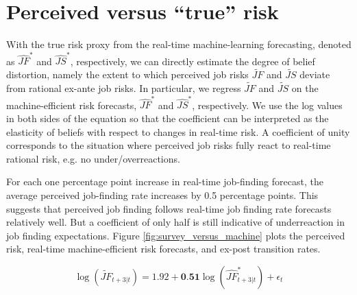 
\section{Perceived versus ``true'' risk}

With the true risk proxy from the real-time machine-learning forecasting, denoted as $\widehat{JF}^*$ and $\widehat{JS}^*$, respectively, we can directly estimate the degree of belief distortion, namely the extent to which perceived job risks $\widetilde{JF}$ and $\widetilde{JS}$ deviate from rational ex-ante job risks. In particular, we regress $\widetilde{JF}$ and $\widetilde{JS}$ on the machine-efficient risk forecasts, $\widehat{JF}^*$ and $\widehat{JS}^*$, respectively. We use the log values in both sides of the equation so that the coefficient can be interpreted as the elasticity of beliefs with respect to changes in real-time risk. A coefficient of unity corresponds to the situation where perceived job risks fully react to real-time rational risk, e.g. no under/overreactions.

For each one percentage point increase in real-time job-finding forecast, the average perceived job-finding rate increases by 0.5 percentage points. This suggests that perceived job finding follows real-time job finding rate forecasts relatively well. But a coefficient of only half is still indicative of underreaction in job finding expectations. Figure \ref{fig:survey_versus_machine} plots the perceived risk, real-time machine-efficient risk forecasts, and ex-post transition rates. 

\begin{equation}
\label{eq:jf_est}
   \log(\widetilde{{JF}}_{t+3|t}) = 1.92 + \textbf{0.51} \log(\widehat {JF}^*_{t+3|t}) + \epsilon_{t}
\end{equation}



